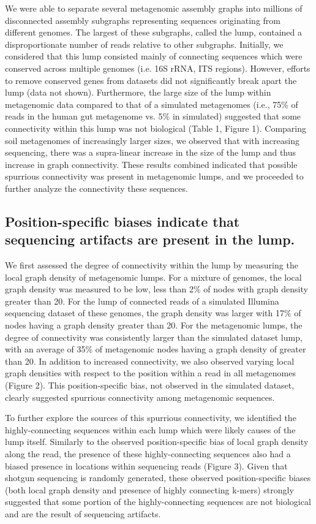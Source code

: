 \documentclass[11pt]{article} %
\begin{document}
We were able to separate several metagenomic assembly graphs into millions of disconnected assembly subgraphs representing sequences originating from different genomes.  The largest of these subgraphs, called the lump, contained a disproportionate number of reads relative to other subgraphs.  Initially, we considered that this lump consisted mainly of connecting sequences which were conserved across multiple genomes (i.e. 16S rRNA, ITS regions).  However, efforts to remove conserved genes from datasets did not significantly break apart the lump (data not shown).  Furthermore, the large size of the lump within metagenomic data compared to that of a simulated metagenomes (i.e., 75\% of reads in the human gut metagenome vs. 5\% in simulated) suggested that some connectivity within this lump was not biological (Table 1, Figure 1).  Comparing soil metagenomes of increasingly larger sizes, we observed that with increasing sequencing, there was a supra-linear increase in the size of the lump and thus increase in graph connectivity. These results combined indicated that possible spurrious connectivity was present in metagenomic lumps, and we proceeded to further analyze the connectivity these sequences.

\subsection{Position-specific biases indicate that sequencing artifacts are present in the lump.}
We first assessed the degree of connectivity within the lump by measuring the local graph density of metagenomic lumps.  For a mixture of genomes, the local graph density was measured to be low, less than 2\% of nodes with graph density greater than 20.  For the lump of connected reads of a simulated Illumina sequencing dataset of these genomes, the graph density was larger with 17\% of nodes having a graph density greater than 20.   For the metagenomic lumps, the degree of connectivity was consistently larger than the simulated dataset lump, with an average of 35\% of metagenomic nodes having a graph density of greater than 20.   In addition to increased connectivity, we also observed varying local graph densities with respect to the position within a read in all metagenomes (Figure 2).  This position-specific bias, not observed in the simulated dataset, clearly suggested spurrious connectivity among metagenomic sequences.  

To further explore the sources of this spurrious connectivity, we identified the highly-connecting sequences within each lump which were likely causes of the lump itself.  Similarly to the observed position-specific bias of local graph density along the read, the presence of these highly-connecting sequences also had a biased presence in locations within sequencing reads (Figure 3).  Given that shotgun sequencing is randomly generated, these observed position-specific biases (both local graph density and presence of highly connecting k-mers) strongly suggested that some portion of the highly-connecting sequences are not biological and are the result of sequencing artifacts.  
\end{document}
